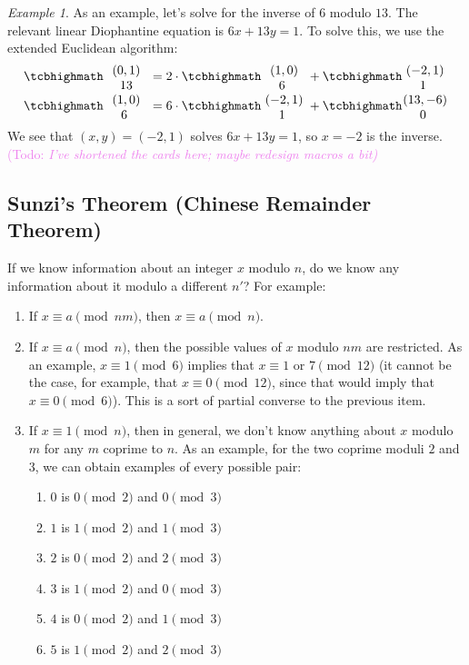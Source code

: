 \documentclass{article}
\theoremstyle{plain}
\theoremstyle{definition}
\theoremstyle{remark}
\newtheorem{example}[theorem]{Example}
\numberwithin{theorem}{section}
\newcommand{\KS}[1]{\textcolor{violet}{{\sf (Todo:} {\sl{#1})}}}
\newcommand{\KS}[1]{}
\begin{document}
\begin{example}
As an example, let's solve for the inverse of $6$ modulo $13$.  The relevant linear Diophantine equation is $6x + 13y = 1$.  To solve this, we use the extended Euclidean algorithm:
    \begin{align*}
      \card{ $(0,1)$ \\  $13$} &= 2  \cdot \card{ $(1,0)$  \\ $6$ } + \card{ $(-2,1)$ \\ $1$ } \\
     \card{ $(1,0)$ \\  $6$ } &= 6  \cdot\card{ $(-2,1)$ \\  $1$ } + \card{ $(13,-6)$ \\ $0$ } 
    \end{align*}
We see that $(x,y) = (-2,1)$ solves $6x+13y=1$, so $x=-2$ is the inverse.\KS{I've shortened the cards here; maybe redesign macros a bit}
\end{example}

\subsection{Sunzi's Theorem (Chinese Remainder Theorem)}

If we know information about an integer $x$ modulo $n$, do we know any information about it modulo a different $n'$?  For example:
\begin{enumerate}
\item If $x \equiv a \pmod {nm}$, then $x \equiv a \pmod{n}$.
\item If $x \equiv a \pmod{n}$, then the possible values of $x$ modulo $nm$ are restricted.  As an example, $x \equiv 1 \pmod{6}$ implies that $x \equiv 1$ or $7 \pmod{12}$ (it cannot be the case, for example, that $x \equiv 0 \pmod{12}$, since that would imply that $x \equiv 0 \pmod{6}$).  This is a sort of partial converse to the previous item.
\item If $x \equiv 1 \pmod{n}$, then in general, we don't know anything about $x$ modulo $m$ for any $m$ coprime to $n$.  As an example, for the two coprime moduli $2$ and $3$, we can obtain examples of every possible pair:
\begin{enumerate}
\item $0$ is $0 \pmod 2$ and $0 \pmod 3$
\item $1$ is $1 \pmod 2$ and $1 \pmod 3$
\item $2$ is $0 \pmod 2$ and $2 \pmod 3$
\item $3$ is $1 \pmod 2$ and $0 \pmod 3$
\item $4$ is $0 \pmod 2$ and $1 \pmod 3$
\item $5$ is $1 \pmod 2$ and $2 \pmod 3$
\end{enumerate}
\end{enumerate}
\end{document}
